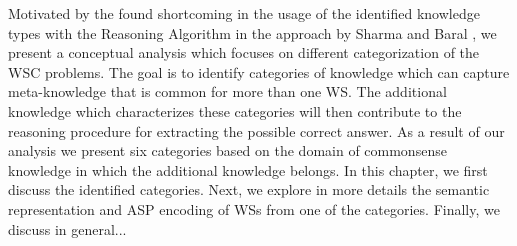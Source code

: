 


Motivated by the found shortcoming in the usage of the identified knowledge types with the Reasoning Algorithm in the approach by Sharma and Baral \cite{2018CommonsenseKT}, we present a conceptual analysis which focuses on different categorization of the WSC problems. The goal is to identify categories of knowledge which can capture meta-knowledge that is common for more than one WS. The additional knowledge which characterizes these categories will then contribute to the reasoning procedure for extracting the possible correct answer. As a result of our analysis we present six categories based on the domain of commonsense knowledge in which the additional knowledge belongs. In this chapter, we first discuss the identified categories. Next, we explore in more details the semantic representation and ASP encoding of WSs from one of the categories. Finally, we discuss in general...

  
\begin{comment}
Similarly as in Sharma et al. \cite{DBLP:conf/ijcai/SharmaVAB15} and in Sharma and Baral \cite{2018CommonsenseKT}, we identify categories of knowledge which are needed in order to answer the questions from the WSs. 
The identified categories are based on the domains of commonsense knowledge from which the required knowledge is.  
We identified six categories with which all problems from the WSC corpus were categorized.
We use the KParser for extracting the semantic graph representation of the sentence. Next we are interested into identifying the relevant knowledge which is needed for resolving the ambiguous pronoun. 
We use the KParser for extracting the graph representation of the input sentence and question. Furthermore, we use the Reasoning Algorithm given in \cite{2018CommonsenseKT} for finding the correct answer with some small modification which will be explained later.
\end{comment}


